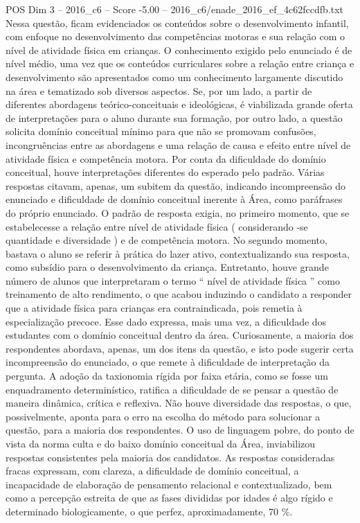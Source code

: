 \begin{textsample}{POS Dim 3 – 2016\_c6 – Score -5.00 – 2016\_c6/enade\_2016\_ef\_4c62fccdfb.txt}
Nessa questão, ficam evidenciados os conteúdos sobre o desenvolvimento infantil, com enfoque no desenvolvimento das competências motoras e sua relação com o nível de atividade física em crianças.
O conhecimento exigido pelo enunciado é de nível médio, uma vez que os conteúdos curriculares sobre a relação entre criança e desenvolvimento são apresentados como um conhecimento largamente discutido na área e tematizado sob diversos aspectos.
Se, por um lado, a partir de diferentes abordagens teórico-conceituais e ideológicas, é viabilizada grande oferta de interpretações para o aluno durante sua formação, por outro lado, a questão solicita domínio conceitual mínimo para que não se promovam confusões, incongruências entre as abordagens e uma relação de causa e efeito entre nível de atividade física e competência motora.
Por conta da dificuldade do domínio conceitual, houve interpretações diferentes do esperado pelo padrão.
Várias respostas citavam, apenas, um subitem da questão, indicando incompreensão do enunciado e dificuldade de domínio conceitual inerente à Área, como paráfrases do próprio enunciado.
O padrão de resposta exigia, no primeiro momento, que se estabelecesse a relação entre nível de atividade física ( considerando -se quantidade e diversidade ) e de competência motora.
No segundo momento, bastava o aluno se referir à prática do lazer ativo, contextualizando sua resposta, como subsídio para o desenvolvimento da criança.
Entretanto, houve grande número de alunos que interpretaram o termo “ nível de atividade física ” como treinamento de alto rendimento, o que acabou induzindo o candidato a responder que a atividade física para crianças era contraindicada, pois remetia à especialização precoce.
Esse dado expressa, mais uma vez, a dificuldade dos estudantes com o domínio conceitual dentro da área.
Curiosamente, a maioria dos respondentes abordava, apenas, um dos itens da questão, e isto pode sugerir certa incompreensão do enunciado, o que remete à dificuldade de interpretação da pergunta.
A adoção da taxionomia rígida por faixa etária, como se fosse um enquadramento determinístico, ratifica a dificuldade de se pensar a questão de maneira dinâmica, crítica e reflexiva.
Não houve diversidade das respostas, o que, possivelmente, aponta para o erro na escolha do método para solucionar a questão, para a maioria dos respondentes.
O uso de linguagem pobre, do ponto de vista da norma culta e do baixo domínio conceitual da Área, inviabilizou respostas consistentes pela maioria dos candidatos.
As respostas consideradas fracas expressam, com clareza, a dificuldade de domínio conceitual, a incapacidade de elaboração de pensamento relacional e contextualizado, bem como a percepção estreita de que as fases divididas por idades é algo rígido e determinado biologicamente, o que perfez, aproximadamente, 70 \%.

\end{textsample}
